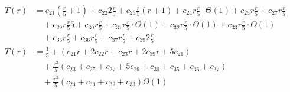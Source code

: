 \begin{subequations}
\label{eq:findedgels2}
\begin{align}
\label{eq:findedgels2-1}
T(r)& =
c_{21}(\frac{r}{5} + 1)
+ c_{22}2\frac{r}{5}
+ c_{23}\frac{r}{5}(r + 1)
+ c_{24}r\frac{r}{5} \cdot \Theta(1)
+ c_{25}r\frac{r}{5}
+ c_{27}r\frac{r}{5}
\\
& \quad
+ c_{29}r\frac{r}{5}5
+ c_{30}r\frac{r}{5}
+ c_{31}r\frac{r}{5} \cdot \Theta(1)
+ c_{32}r\frac{r}{5} \cdot \Theta(1)
+ c_{33}r\frac{r}{5} \cdot \Theta(1)
\nonumber \\
& \quad
+ c_{35}r\frac{r}{5}
+ c_{36}r\frac{r}{5}
+ c_{37}r\frac{r}{5}
+ c_{39}2\frac{r}{5}
\nonumber \\
\label{eq:findedgels2-2}
T(r)& =
\frac{1}{5} + (c_{21}r + 2c_{22}r + c_{23}r + 2c_{39}r + 5c_{21})
\\
& \quad
+ \frac{r^2}{5} (c_{23} + c_{25} + c_{27} + 5c_{29} + c_{30}+ c_{35} + c_{36} + c_{37})
\nonumber \\
& \quad
+ \frac{r^2}{5}(c_{24} + c_{31} + c_{32} + c_{33}) \Theta(1)
\nonumber
\end{align}
\end{subequations}
